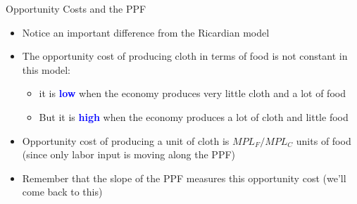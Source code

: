 \documentclass[10pt,hyperref={CJKbookmarks=true},xcolor=dvipsnames,aspectratio=169]{beamer}
\begin{document}
\begin{frame}{Opportunity Costs and the PPF }

\begin{itemize}
\item Notice an important difference from the Ricardian model 
\item The opportunity cost of producing cloth in terms of food is not constant
in this model: 

\begin{itemize}
\item it is \textbf{\textcolor{blue}{low}} when the economy produces very
little cloth and a lot of food 
\item But it is \textbf{\textcolor{blue}{high}} when the economy produces
a lot of cloth and little food 
\end{itemize}
\item Opportunity cost of producing a unit of cloth is $MPL_{F}/MPL_{C}$
units of food (since only labor input is moving along the PPF)
\item Remember that the slope of the PPF measures this opportunity cost
(we’ll come back to this) 
\end{itemize}
\end{frame}
\end{document}
